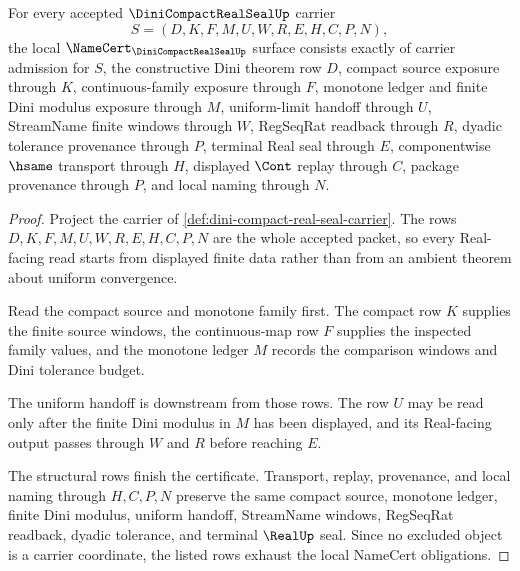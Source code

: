 \begin{theorem}
\label{thm:dini-compact-real-seal-namecert-obligations}
For every accepted $\DiniCompactRealSealUp$ carrier
$$
S=(D,K,F,M,U,W,R,E,H,C,P,N),
$$
the local $\NameCert_{\DiniCompactRealSealUp}$ surface consists exactly of carrier admission for $S$, the constructive Dini theorem row $D$, compact source exposure through $K$, continuous-family exposure through $F$, monotone ledger and finite Dini modulus exposure through $M$, uniform-limit handoff through $U$, StreamName finite windows through $W$, RegSeqRat readback through $R$, dyadic tolerance provenance through $P$, terminal Real seal through $E$, componentwise $\hsame$ transport through $H$, displayed $\Cont$ replay through $C$, package provenance through $P$, and local naming through $N$.
\end{theorem}
\begin{proof}
Project the carrier of \autoref{def:dini-compact-real-seal-carrier}. The rows $D,K,F,M,U,W,R,E,H,C,P,N$ are the whole accepted packet, so every Real-facing read starts from displayed finite data rather than from an ambient theorem about uniform convergence.

Read the compact source and monotone family first. The compact row $K$ supplies the finite source windows, the continuous-map row $F$ supplies the inspected family values, and the monotone ledger $M$ records the comparison windows and Dini tolerance budget.

The uniform handoff is downstream from those rows. The row $U$ may be read only after the finite Dini modulus in $M$ has been displayed, and its Real-facing output passes through $W$ and $R$ before reaching $E$.

The structural rows finish the certificate. Transport, replay, provenance, and local naming through $H,C,P,N$ preserve the same compact source, monotone ledger, finite Dini modulus, uniform handoff, StreamName windows, RegSeqRat readback, dyadic tolerance, and terminal $\RealUp$ seal. Since no excluded object is a carrier coordinate, the listed rows exhaust the local NameCert obligations.
\end{proof}

